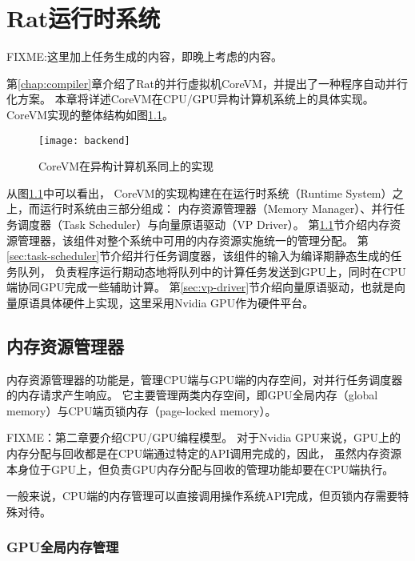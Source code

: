 \chapter{Rat运行时系统}
FIXME:这里加上任务生成的内容，即晚上考虑的内容。

第\ref{chap:compiler}章介绍了Rat的并行虚拟机CoreVM，并提出了一种程序自动并行化方案。
本章将详述CoreVM在CPU/GPU异构计算机系统上的具体实现。
CoreVM实现的整体结构如图\ref{fig:backend}。
\begin{figure}
  \centering
  \texttt{[image: backend]}
  \caption{CoreVM在异构计算机系同上的实现}
  \label{fig:backend}
\end{figure}

从图\ref{fig:backend}中可以看出，
CoreVM的实现构建在在运行时系统（Runtime System）之上，而运行时系统由三部分组成：
内存资源管理器（Memory Manager）、并行任务调度器（Task Scheduler）与向量原语驱动（VP Driver）。
第\ref{sec:memory-manager}节介绍内存资源管理器，该组件对整个系统中可用的内存资源实施统一的管理分配。
第\ref{sec:task-scheduler}节介绍并行任务调度器，该组件的输入为编译期静态生成的任务队列，
负责程序运行期动态地将队列中的计算任务发送到GPU上，同时在CPU端协同GPU完成一些辅助计算。
第\ref{sec:vp-driver}节介绍向量原语驱动，也就是向量原语具体硬件上实现，这里采用Nvidia GPU作为硬件平台。

\section{内存资源管理器}\label{sec:memory-manager}
内存资源管理器的功能是，管理CPU端与GPU端的内存空间，对并行任务调度器的内存请求产生响应。
它主要管理两类内存空间，即GPU全局内存（global memory）与CPU端页锁内存（page-locked memory）。

FIXME：第二章要介绍CPU/GPU编程模型。
对于Nvidia GPU来说，GPU上的内存分配与回收都是在CPU端通过特定的API调用完成的，因此，
虽然内存资源本身位于GPU上，但负责GPU内存分配与回收的管理功能却要在CPU端执行。

一般来说，CPU端的内存管理可以直接调用操作系统API完成，但页锁内存需要特殊对待。

\subsection{GPU全局内存管理}


